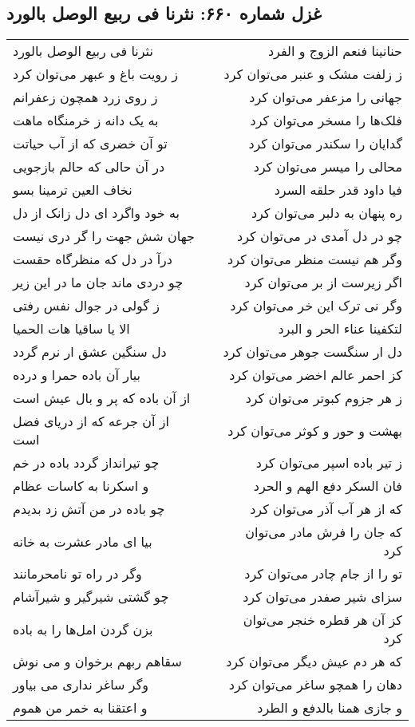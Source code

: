 \begin{center}
\section*{غزل شماره ۶۶۰: نثرنا فی ربیع الوصل بالورد}
\label{sec:0660}
\begin{longtable}{l p{0.5cm} r}
نثرنا فی ربیع الوصل بالورد
&&
حنانینا فنعم الزوج و الفرد
\\
ز رویت باغ و عبهر می‌توان کرد
&&
ز زلفت مشک و عنبر می‌توان کرد
\\
ز روی زرد همچون زعفرانم
&&
جهانی را مزعفر می‌توان کرد
\\
به یک دانه ز خرمنگاه ماهت
&&
فلک‌ها را مسخر می‌توان کرد
\\
تو آن خضری که از آب حیاتت
&&
گدایان را سکندر می‌توان کرد
\\
در آن حالی که حالم بازجویی
&&
محالی را میسر می‌توان کرد
\\
نخاف العین ترمینا بسو
&&
فیا داود قدر حلقه السرد
\\
به خود واگرد ای دل زانک از دل
&&
ره پنهان به دلبر می‌توان کرد
\\
جهان شش جهت را گر دری نیست
&&
چو در دل آمدی در می‌توان کرد
\\
درآ در دل که منظرگاه حقست
&&
وگر هم نیست منظر می‌توان کرد
\\
چو دردی ماند جان ما در این زیر
&&
اگر زیرست از بر می‌توان کرد
\\
ز گولی در جوال نفس رفتی
&&
وگر نی ترک این خر می‌توان کرد
\\
الا یا ساقیا هات الحمیا
&&
لتکفینا عناء الحر و البرد
\\
دل سنگین عشق ار نرم گردد
&&
دل ار سنگست جوهر می‌توان کرد
\\
بیار آن باده حمرا و درده
&&
کز احمر عالم اخضر می‌توان کرد
\\
از آن باده که پر و بال عیش است
&&
ز هر جزوم کبوتر می‌توان کرد
\\
از آن جرعه که از دریای فضل است
&&
بهشت و حور و کوثر می‌توان کرد
\\
چو تیرانداز گردد باده در خم
&&
ز تیر باده اسپر می‌توان کرد
\\
و اسکرنا به کاسات عظام
&&
فان السکر دفع الهم و الحرد
\\
چو باده در من آتش زد بدیدم
&&
که از هر آب آذر می‌توان کرد
\\
بیا ای مادر عشرت به خانه
&&
که جان را فرش مادر می‌توان کرد
\\
وگر در راه تو نامحرمانند
&&
تو را از جام چادر می‌توان کرد
\\
چو گشتی شیرگیر و شیرآشام
&&
سزای شیر صفدر می‌توان کرد
\\
بزن گردن امل‌ها را به باده
&&
کز آن هر قطره خنجر می‌توان کرد
\\
سقاهم ربهم برخوان و می نوش
&&
که هر دم عیش دیگر می‌توان کرد
\\
وگر ساغر نداری می بیاور
&&
دهان را همچو ساغر می‌توان کرد
\\
و اعتقنا به خمر من هموم
&&
و جازی همنا بالدفع و الطرد
\\
\end{longtable}
\end{center}
